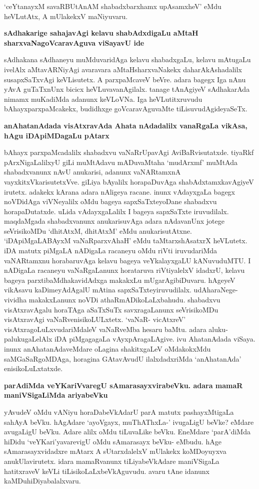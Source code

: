 `ceYtanayxM savaRBUtAnAM shabadxbarxhamx upAsamxheV' eMdu heVLutAtx, A mUlakekxV maNiyuvaru.\label{203}

\noindent
{\bf\large{sAdhakarige sahajavAgi kelavu shabAdxdigaLu aMtaH sharxvaNagoVcaravAguva viSayavU ide}}\label{page203}

sAdhakana sAdhaneyu muMduvaridAga kelavu shabadxgaLu, kelavu mAtugaLu ivelAlx aMtavARNiyAgi avaravara aMtaHsharxvaNakekx daharAkAshadalilx susapxSaTxvAgi keVLisutetx. A parxpaMcaveV beVre. adara bagegx Iga nAnu yAvA guTaTxnUnx bicicx heVLuvavanAgilalx. tanage tAnAgiyeV sAdhakarAda nimamx muKadiMda adanunx keVLoVNa. Iga heVLutitxruvudu bAhayxparxpaMcakekx, budidhxge goVcaravAguvaMte tiLisuvudAgideyaSeTx.

\noindent
{\bf\large{anAhatanAdada visAtxravAda Ahata nAdadalilx vanaRgaLa vikAsa, hAgu iDApiMDagaLu pAtarx}}\label{page211}

bAhayx parxpaMcadalilx shabadxvu vaNaRrUpavAgi AviBaRvisutatxde. tiyaRkf pArxNigaLalilxyU giLi muMtAdavu mADuvaMtaha `mudArxmf' muMtAda shabadxvanunx nAvU anukarisi, adanunx vaNARtamxnA vayxkitxVkarisutetxVve. giLiya bAyalilx horapaDuvAga shabAdxtamxkavAgiyeV irutetx. adakekx kArana adara nAligeya racane. inunx vAdayxgaLa bagegx noVDidAga viVNeyalilx oMdu bageya sapxSaTxteyoDane shabadxvu horapaDutatxde. uLida vAdayxgaLalilx I bageya sapxSaTxte iruvudilalx. maqdaMgada shabadxvanunx anukarisuvAga adara nAdavanUnx jotege seVrisikoMDu `dhitAtxM, dhitAtxM' eMdu anukarisutAtxne. `iDApiMgaLABAyxM vaNaRparxvAhaH'\label{204} eMdu taMtarxshAsatxrX heVLutetx. iDA matutx piMgaLA nADigaLa racaneyu oMdu riVti iruvudariMda vaNARtamxnu horabaruvAga kelavu bageya veYkalayxgaLU kANuvuduMTU. I nADigaLa racaneyu vaNaRgaLanunx horataruva riVtiyalelxV idadxrU, kelavu bageya parxtibaMdhakavidAdxga makakxLu mUgarAgibiDuvaru. hAgeyeV vikAsavu kaDimeyAdAgalU mAtina sapxSaTxteyiruvudilalx. udAharaNege- vividha makakxLanunx noVDi athaRmADikoLaLxbahudu. shabadxvu visAtxravAgalu horaTAga aSaTxSuTx savxragaLanunx seVrisikoMDu visAtxravAgi vaNaRvenisikoLULxtetx. `vaNaR- vicAtxreV' visAtxragoLuLxvudariMdaleV vaNaRveMba hesaru baMtu. adara aluku-palukugaLelAlx iDA piMgagagaLa vAyxpAragaLAgive. ivu AhatanAdada viSaya. inunx anAhatanAdaveMdare oLagina shakitxgaLeV oMdakokxMdu saMGaSaRgoMDAga, horagina GAtavAvudU ilalxdadxriMda `anAhatanAda' enisikoLuLxtatxde.

\noindent
{\bf\large{parAdiMda veYKariVvaregU sAmarasayxvirabeVku. adara mamaR maniVSigaLiMda ariyabeVku}}\label{page204}

yAvudeV oMdu vANiyu horaDabeVkAdarU parA matutx pashayxMtigaLa sahAyA beVku. hAgAdare `ayoVgayx, muThAThxLa-' ivugaLigU beVke? eMdare avugaLigU beVku. Adare alilx oMdu tiLuvaLike beVku. EneMdare `parA'diMda hiDidu `veYKari'yavarevigU oMdu sAmarasayx beVku- eMbudu. hAge sAmarasayxvidadxre mAtarx A sUtarxdalelxV mUlakekx koMDoyuyxva anukUlavirutetx. idara mamaRvanunx tiLiyabeVkAdare maniVSigaLa hatitxraveV keVLi tiLisikoLaLxbeVkAguvudu. avaru tAne idanunx kaMDuhiDiyabalalxvaru.

